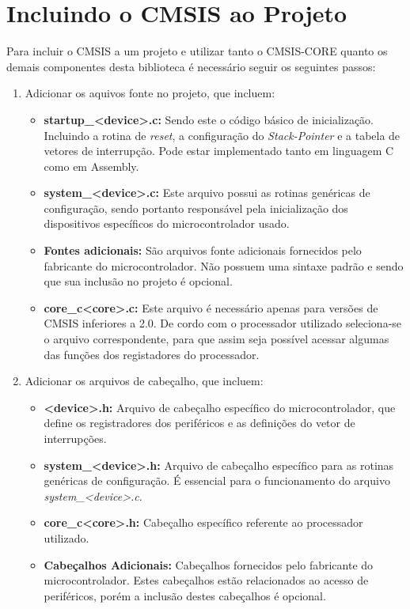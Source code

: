 \section{Incluindo o CMSIS ao Projeto}

Para incluir o CMSIS a um projeto e utilizar tanto  o CMSIS-CORE quanto os demais componentes desta biblioteca é necessário seguir os seguintes passos: 

\begin{enumerate}
	\item Adicionar os aquivos fonte no projeto, que incluem:
	\begin{itemize}
		\item \textbf{startup\_<device>.c:}  Sendo este o código básico de inicialização. Incluindo a rotina de \emph{reset}, a configuração do \emph{Stack-Pointer} e a tabela de vetores de interrupção. Pode estar implementado tanto em linguagem C como em Assembly.
		\item \textbf{system\_<device>.c:} Este arquivo possui as rotinas genéricas de configuração, sendo portanto responsável pela inicialização dos dispositivos específicos do microcontrolador usado.
		\item  \textbf{Fontes adicionais:} São arquivos fonte adicionais fornecidos pelo fabricante do microcontrolador. Não possuem uma sintaxe padrão e sendo que sua inclusão no projeto é opcional. 
		\item \textbf{core\_c<core>.c:} Este arquivo é necessário apenas para versões de CMSIS inferiores a 2.0. De cordo com o processador utilizado seleciona-se o arquivo correspondente, para que assim seja possível  acessar algumas das funções dos  registadores do processador.
	\end{itemize}
	
	\item Adicionar os arquivos de cabeçalho, que incluem:
	\begin{itemize}
		\item \textbf{<device>.h:} Arquivo de cabeçalho específico do microcontrolador, que define os registradores dos periféricos e as definições do vetor de interrupções.
		\item \textbf{system\_<device>.h:} Arquivo de cabeçalho específico para as rotinas genéricas de configuração. É essencial para o funcionamento do arquivo \emph{system\_<device>.c}.
		\item \textbf{core\_c<core>.h:} Cabeçalho específico referente ao processador utilizado.
		\item  \textbf{Cabeçalhos Adicionais:} Cabeçalhos fornecidos pelo fabricante do microcontrolador. Estes cabeçalhos estão relacionados ao acesso de periféricos, porém a inclusão destes cabeçalhos é opcional.
	\end{itemize}
\end{enumerate}





